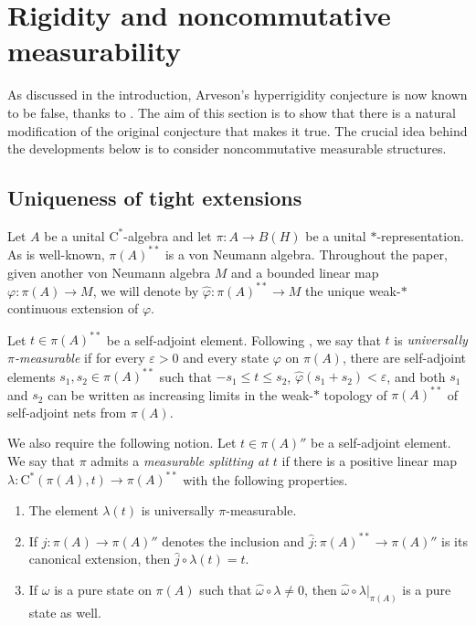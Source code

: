 \documentclass[10pt]{amsart}
\newcommand{\rC}{\mathrm{C}}
\newcommand{\eps}{\varepsilon}
\renewcommand{\phi}{\varphi}
\theoremstyle{definition}
\begin{document}
\section{Rigidity and noncommutative measurability}\label{S:Meas}

As discussed in the introduction, Arveson's hyperrigidity conjecture is now known to be false, thanks to \cite{bilich2024arveson}. The aim of this section is to show that there is a natural modification of the original conjecture that makes it true. The crucial idea behind the developments below is to consider noncommutative measurable structures.

\subsection{Uniqueness of tight extensions}\label{SS:msue}
Let $A$ be a unital $\rC^*$-algebra and let $\pi:A\to B(H)$ be a unital $*$-representation. As is well-known, $\pi(A)^{**}$ is a von Neumann algebra.  Throughout the paper,  given another von Neumann algebra $M$ and a bounded linear map $\phi:\pi(A)\to M$, we will denote by $\widehat\phi:\pi(A)^{**}\rightarrow M$ the unique weak-$*$ continuous extension of $\varphi$.

Let  $t\in \pi(A)^{**}$ be a self-adjoint element. Following \cite[Paragraph 4.3.11]{eilers2018c}, we say that $t$ is \emph{universally $\pi$-measurable} if for every $\eps>0$ and every state $\phi$ on $\pi(A)$, there are self-adjoint elements $s_1,s_2\in \pi(A)^{**}$ such that $-s_1\leq t\leq s_2$, $\widehat\phi(s_1+s_2)<\eps$, and both $s_1$ and $s_2$ can be written as  increasing limits in the weak-$*$ topology  of $\pi(A)^{**}$ of self-adjoint nets from $\pi(A)$. 



We also require the following notion.  
Let $t\in \pi(A)''$ be a self-adjoint  element.
We say that $\pi$ admits a \emph{measurable splitting at $t$} if there is a positive linear map
$\lambda:\rC^*(\pi(A),t)\to \pi(A)^{**}$ with the following properties.
\begin{enumerate}
\item[{\rm (s1)}] The element  $\lambda(t)$ is universally $\pi$-measurable.
\item[{\rm (s2)}] If $j:\pi(A)\to\pi(A)''$ denotes the inclusion and $\widehat j:\pi(A)^{**}\to \pi(A)''$ is its canonical extension, then $\widehat j\circ \lambda(t)=t$. 
\item[{\rm (s3)}] If $\omega$ is a pure state on $\pi(A)$ such that $\widehat\omega\circ \lambda\neq 0$, then $\widehat\omega\circ \lambda|_{\pi(A)}$ is a pure state as well.
\end{enumerate}
\end{document}
